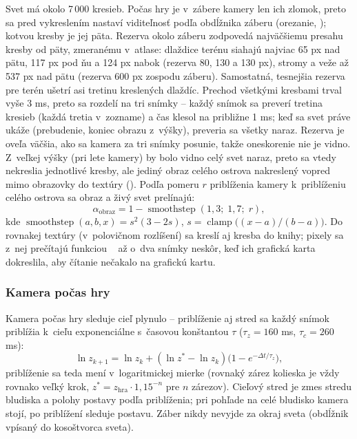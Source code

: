 \documentclass[11pt, a4paper]{article}
\begin{document}
Svet má okolo 7\,000 kresieb. Počas hry je v~zábere kamery len ich zlomok, preto sa pred
vykreslením nastaví viditeľnosť podľa obdĺžnika záberu (orezanie, ); kotvou kresby je
jej päta. Rezerva okolo záberu zodpovedá najväčšiemu presahu kresby od päty, zmeranému
v~atlase: dlaždice terénu siahajú najviac 65 px nad pätu, 117 px pod ňu a 124 px nabok
(rezerva 80, 130 a 130 px), stromy a veže až 537 px nad pätu (rezerva 600 px zospodu záberu).
Samostatná, tesnejšia rezerva pre terén ušetrí asi tretinu kreslených dlaždíc. Prechod všetkými
kresbami trval vyše 3 ms, preto sa rozdelí na tri snímky – každý snímok sa preverí tretina
kresieb (každá tretia v~zozname) a čas klesol na približne 1 ms; keď sa svet práve ukáže
(prebudenie, koniec obrazu z~výšky), preveria sa všetky naraz. Rezerva je oveľa väčšia, ako
sa kamera za tri snímky posunie, takže oneskorenie nie je vidno. Z~veľkej výšky (pri lete
kamery) by bolo vidno celý svet naraz, preto sa vtedy nekreslia jednotlivé kresby, ale jediný obraz
celého ostrova nakreslený vopred mimo obrazovky do textúry 
(). Podľa pomeru $r$ priblíženia kamery k~priblíženiu celého ostrova sa obraz
a živý svet prelínajú:
\begin{equation}
  \alpha_{\text{obraz}} = 1 - \operatorname{smoothstep}(1{,}3;\; 1{,}7;\; r),
\end{equation}
kde $\operatorname{smoothstep}(a, b, x) = s^2 (3 - 2s)$, $s = \operatorname{clamp}\bigl((x - a)/(b - a)\bigr)$.
Do rovnakej textúry (v~polovičnom rozlíšení) sa kreslí aj kresba do knihy; pixely sa z~nej
prečítajú funkciou ~\cite{MdnReadPixels} až o~dva snímky neskôr, keď ich
grafická karta dokreslila, aby čítanie nečakalo na grafickú kartu.

\subsubsection{Kamera počas hry}

Kamera počas hry sleduje cieľ plynulo – priblíženie aj stred sa každý snímok priblížia k~cieľu
exponenciálne s~časovou konštantou $\tau$ ($\tau_z = 160$ ms, $\tau_c = 260$ ms):
\begin{equation}
  \ln z_{k+1} = \ln z_k + (\ln z^* - \ln z_k)\bigl(1 - e^{-\Delta t / \tau_z}\bigr),
\end{equation}
priblíženie sa teda mení v~logaritmickej mierke (rovnaký zárez kolieska je vždy rovnako veľký
krok, $z^* = z_{\text{hra}} \cdot 1{,}15^{-n}$ pre $n$ zárezov). Cieľový stred je zmes stredu
bludiska a polohy postavy podľa priblíženia; pri pohľade na celé bludisko kamera stojí, po
priblížení sleduje postavu. Záber nikdy nevyjde za okraj sveta (obdĺžnik vpísaný do kosoštvorca
sveta).
\end{document}

